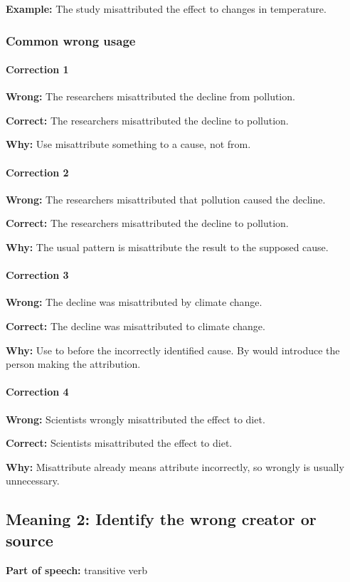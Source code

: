 \documentclass[11pt]{article}
\begin{document}
\textbf{Example:} The study misattributed the effect to changes in temperature.

\subsubsection{Common wrong usage}
\paragraph{Correction 1}
\textbf{Wrong:} The researchers misattributed the decline from pollution.

\textbf{Correct:} The researchers misattributed the decline to pollution.

\textbf{Why:} Use misattribute something to a cause, not from.

\paragraph{Correction 2}
\textbf{Wrong:} The researchers misattributed that pollution caused the decline.

\textbf{Correct:} The researchers misattributed the decline to pollution.

\textbf{Why:} The usual pattern is misattribute the result to the supposed cause.

\paragraph{Correction 3}
\textbf{Wrong:} The decline was misattributed by climate change.

\textbf{Correct:} The decline was misattributed to climate change.

\textbf{Why:} Use to before the incorrectly identified cause. By would introduce the person making the attribution.

\paragraph{Correction 4}
\textbf{Wrong:} Scientists wrongly misattributed the effect to diet.

\textbf{Correct:} Scientists misattributed the effect to diet.

\textbf{Why:} Misattribute already means attribute incorrectly, so wrongly is usually unnecessary.

\subsection{Meaning 2: Identify the wrong creator or source}
\textbf{Part of speech:} transitive verb
\end{document}
